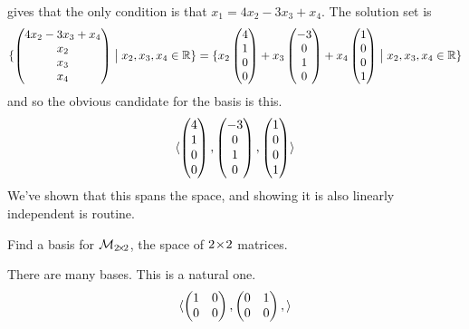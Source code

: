 \begin{exercises}
\begin{answer}
\begin{equation*}
      \end{equation*}
      gives that the only condition is that 
      $x_1=4x_2-3x_3+x_4$.
      The solution set is
      \begin{equation*}
        \mbox{$\{\begin{pmatrix} 4x_2-3x_3+x_4 \\ x_2 \\ x_3 \\ x_4 \end{pmatrix}
               \bigm| x_2,x_3,x_4\in\mathbb{R}\}$}
        =\mbox{$\{x_2\begin{pmatrix} 4 \\ 1 \\ 0 \\ 0 \end{pmatrix}
             +x_3\begin{pmatrix} -3 \\ 0 \\ 1 \\ 0 \end{pmatrix}
             +x_4\begin{pmatrix} 1 \\ 0 \\ 0 \\ 1 \end{pmatrix} \bigm| x_2,x_3,x_4\in\mathbb{R}\}$}
      \end{equation*}
      and so the obvious candidate for the basis is this.
      \begin{equation*}
       \langle\begin{pmatrix} 4 \\ 1 \\ 0 \\ 0 \end{pmatrix},
                   \begin{pmatrix} -3 \\ 0 \\ 1 \\ 0 \end{pmatrix},
                   \begin{pmatrix} 1 \\ 0 \\ 0 \\ 1 \end{pmatrix}  \rangle
      \end{equation*}  
      We've shown that this spans the space, and showing it is also linearly
      independent is routine.
    \end{answer}
  \recommended \item
    Find a basis for \( \mathcal{M}_{2 \! \times \! 2} \),
    the space of \( 2 \! \times \! 2 \) matrices.
    \begin{answer}
      There are many bases.
      This is a natural one.
      \begin{equation*}
        \langle
           \begin{pmatrix}
             1  &0  \\
             0  &0
           \end{pmatrix},
           \begin{pmatrix}
             0  &1  \\
             0  &0
           \end{pmatrix},
\rangle
\end{equation*}
\end{answer}
\end{exercises}
